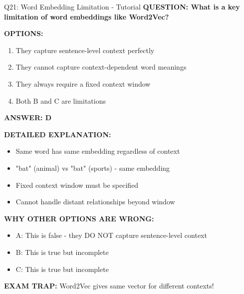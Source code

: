 \documentclass[8pt]{beamer}
\begin{document}
	\begin{frame}{Q21: Word Embedding Limitation - Tutorial}
		\fontsize{6.5}{7.5}\selectfont
		\textbf{QUESTION: What is a key limitation of word embeddings like Word2Vec?}
		
		\vspace{0.1cm}
		\textbf{OPTIONS:}
		\begin{enumerate}
			\item They capture sentence-level context perfectly
			\item They cannot capture context-dependent word meanings
			\item They always require a fixed context window
			\item Both B and C are limitations
		\end{enumerate}
		
		\vspace{0.1cm}
		\textcolor{myblue}{\textbf{ANSWER: D}}
		
		\vspace{0.1cm}
		\textbf{DETAILED EXPLANATION:}
		\begin{itemize}
			\item Same word has same embedding regardless of context
			\item "bat" (animal) vs "bat" (sports) - same embedding
			\item Fixed context window must be specified
			\item Cannot handle distant relationships beyond window
		\end{itemize}
		
		\vspace{0.1cm}
		\textcolor{myred}{\textbf{WHY OTHER OPTIONS ARE WRONG:}}
		\begin{itemize}
			\item \textcolor{myred}{A:} This is false - they DO NOT capture sentence-level context
			\item \textcolor{myred}{B:} This is true but incomplete
			\item \textcolor{myred}{C:} This is true but incomplete
		\end{itemize}
		
		\textcolor{myred}{\textbf{EXAM TRAP:}} Word2Vec gives \textcolor{myblue}{same vector for different contexts}!
	\end{frame}
	
\end{document}
